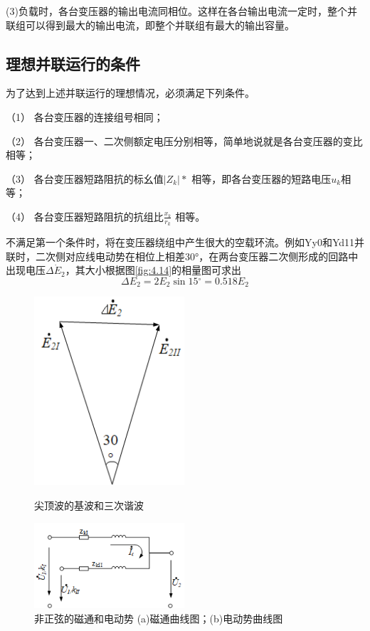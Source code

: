 \documentclass{book}
\begin{document}
(3)负载时，各台变压器的输出电流同相位。这样在各台输出电流一定时，整个并联组可以得到最大的输出电流，即整个并联组有最大的输出容量。

\subsection{理想并联运行的条件}

为了达到上述并联运行的理想情况，必须满足下列条件。

（1）	各台变压器的连接组号相同；

（2）	各台变压器一、二次侧额定电压分别相等，简单地说就是各台变压器的变比相等；

（3）	各台变压器短路阻抗的标幺值$\left| {{Z}_{k}} \right|*$ 相等，即各台变压器的短路电压${{u}_{k}}$相等；

（4）	各台变压器短路阻抗的抗组比$\frac{{{x}_{k}}}{{{r}_{k}}}$ 相等。

不满足第一个条件时，将在变压器绕组中产生很大的空载环流。例如Yy0和Yd11并联时，二次侧对应线电动势在相位上相差30°，在两台变压器二次侧形成的回路中出现电压$\Delta {{\dot{E}}_{2}}$，其大小根据图\ref{fig:4.14}的相量图可求出
\begin{equation}
\Delta {{E}_{2}}=2{{E}_{2}}\sin 15{}^\circ =0.518{{E}_{2}}
\label{4-3}
\end{equation}

\begin{figure}  
	\begin{minipage}[H]{0.45\linewidth}  
		\centering  
		\includegraphics[width=2.2in]{4-14g.png}  
		\caption{尖顶波的基波和三次谐波}  
		\label{fig:4.14}  
	\end{minipage}
	\begin{minipage}[H]{0.45\linewidth}  
		\centering  
		\includegraphics[width=2.2in]{4-15g.png}  
		\caption{非正弦的磁通和电动势
			(a)磁通曲线图；(b)电动势曲线图}  
		\label{fig:4.15}  
	\end{minipage}  
\end{figure}
\end{document}
